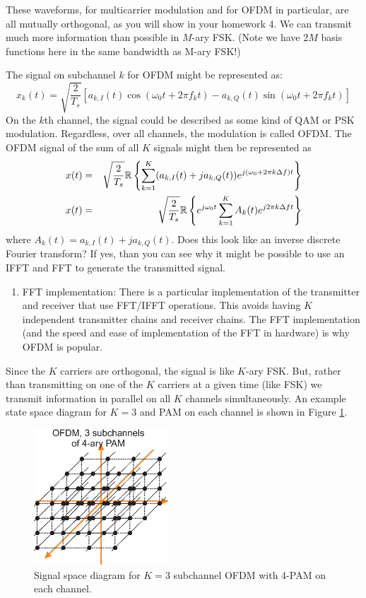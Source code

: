 These waveforms, for multicarrier modulation and for OFDM in particular, are all mutually orthogonal, as you will show in your homework 4.  We can transmit much more information than possible in
$M$-ary FSK.  (Note we have $2M$ basis functions here in the same bandwidth as M-ary FSK!)


The signal on subchannel $k$ for OFDM might be represented as:
\[
  x_k(t) = \sqrt{\frac{2}{T_{s}}} \left[ a_{k,I}(t) \cos(\omega_0 t  + 2\pi f_k t) - a_{k,Q}(t) \sin(\omega_0 t + 2\pi f_k t) \right]
\]
On the $k$th channel, the signal could be described as some kind of QAM or PSK modulation. Regardless, over all channels, the modulation is called OFDM.  The OFDM  signal of the sum of all $K$ signals might then be represented as
\begin{eqnarray}
  x(t) &=& \sqrt{\frac{2}{T_{s}}} \mathbb{R} \left\{ \sum_{k=1}^K (a_{k,I}(t) + j a_{k,Q}(t))  e^{j(\omega_0 + 2\pi k \Delta f )t}  \right\} \nonumber \\
  x(t) &=& \sqrt{\frac{2}{T_{s}}} \mathbb{R} \left\{ e^{j\omega_0 t} \sum_{k=1}^K A_{k}(t)  e^{j2\pi k \Delta f t}  \right\}
\end{eqnarray}
where $A_{k}(t) = a_{k,I}(t) + j a_{k,Q}(t)$. Does this look like an
inverse discrete Fourier transform? If yes, than you can see why it
might be possible to use an IFFT and FFT to generate the transmitted signal.

\begin{enumerate}
  \item FFT implementation:  There is a particular implementation of
  the transmitter and receiver that use FFT/IFFT operations.  This
  avoids having $K$ independent transmitter chains and receiver
  chains.  The FFT implementation (and the speed and ease of implementation of the FFT in hardware) is why OFDM
  is popular.
\end{enumerate}


Since the $K$ carriers are orthogonal, the signal is like $K$-ary
FSK. But, rather than transmitting on one of the $K$ carriers at a
given time (like FSK) we transmit information in parallel on all $K$
channels simultaneously.  An example state space diagram for $K=3$
and PAM on each channel is shown in Figure
\ref{F:OFDM-state-space-diagram}.

\begin{figure}[htbp]
  \centerline{\includegraphics[width=0.45\textwidth]{../images/OFDM-K3-4PAM-signalSpaceDiagram.eps} }
  \caption{Signal space diagram for $K=3$ subchannel OFDM with 4-PAM on each channel.}
  \label{F:OFDM-state-space-diagram}
\end{figure}

